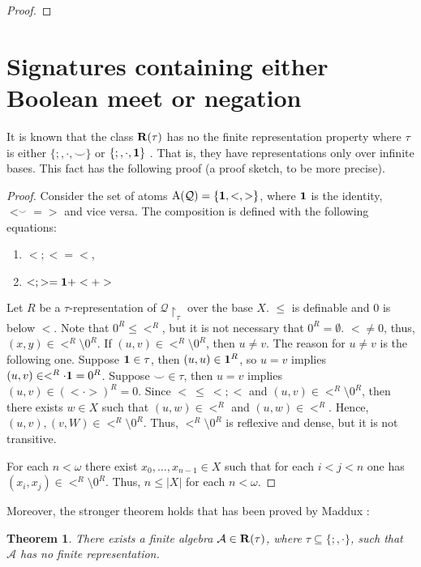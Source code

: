 \documentclass[a4paper]{article}
\theoremstyle{defin}
\theoremstyle{theorem}
\newtheorem{theorem}{Theorem}
\theoremstyle{prop}
\theoremstyle{lemma}
\theoremstyle{ex}
\theoremstyle{col}
\theoremstyle{claim}
\begin{document}
\begin{proof}
\end{proof}


\section{Signatures containing either Boolean meet or negation}

It is known that the class ${\bf R}(\tau)$ has no the finite representation property where $\tau$ is either $\{ ;, \cdot, \smile\}$ or $\{ ;, \cdot, {\bf 1} \}$ \cite{hirsch2004finite}. That is, they have representations only over infinite bases. This fact has the following proof (a proof sketch, to be more precise).
\begin{proof}
Consider the set of atoms $\operatorname{A}(\mathcal{Q}) = \{ {\bf 1}, <, > \}$, where ${\bf 1}$ is the identity, $<^{\smile} = >$ and vice versa. The composition is defined with the following equations:
\begin{enumerate}
  \item $< ; < = <$,
  \item $< ; > = {\bf 1} + < + >$
\end{enumerate}

Let $R$ be a $\tau$-representation of $\mathcal{Q} \upharpoonright_{\tau}$ over the base $X$. $\leq$ is definable and $0$ is below $<$. Note that $0^{R} \leq <^R$, but it is not necessary that $0^R = \emptyset$. $< \neq 0$, thus, $(x,y) \in <^R \setminus 0^R$. If $(u, v) \in <^R \setminus 0^R$, then $u \neq v$.
The reason for $u \neq v$ is the following one. Suppose ${\bf 1} \in \tau$, then $(u,u) \in {\bf 1}^R$, so $u = v$ implies $(u, v) \in <^R \cdot {\bf 1} = 0^R$. Suppose $\smile \in \tau$,
then $u = v$ implies $(u,v) \in (< \cdot >)^R = 0$. Since $< \: \leq \: < ; <$ and $(u, v) \in <^R \setminus 0^R$, then there exists $w \in X$ such that $(u, w) \in <^R$ and $(u, w) \in <^R$. Hence, $(u, v), (v, W) \in <^R \setminus 0^R$. Thus, $<^R \setminus 0^R$ is reflexive and dense, but it is not transitive.

For each $n < \omega$ there exist $x_0, \dots, x_{n - 1} \in X$ such that for each $i < j < n$ one has $(x_i, x_j) \in <^R \setminus 0^R$. Thus, $n \leq |X|$ for each $n < \omega$.
\end{proof}

Moreover, the stronger theorem holds that has been proved by Maddux \cite{maddux2016finite}:
\begin{theorem}
  There exists a finite algebra $\mathcal{A} \in {\bf R}(\tau)$, where $\tau \subseteq \{ ;, \cdot \}$, such that $\mathcal{A}$ has no finite representation.
\end{theorem}
\end{document}
